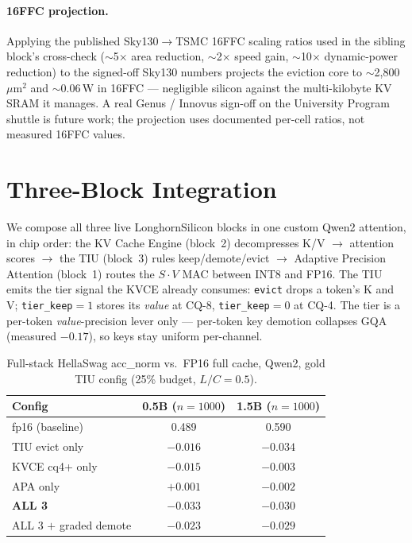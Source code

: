 \documentclass[10pt,twocolumn]{article}
\begin{document}
\paragraph{16FFC projection.}
Applying the published Sky130$\to$TSMC 16FFC scaling ratios used in the sibling
block's cross-check ($\sim$5$\times$ area reduction, $\sim$2$\times$ speed gain,
$\sim$10$\times$ dynamic-power reduction) to the signed-off Sky130 numbers projects
the eviction core to $\sim$2{,}800~$\mu$m$^2$ and $\sim$0.06\,\textmu W in 16FFC ---
negligible silicon against the multi-kilobyte KV SRAM it manages. A real Genus /
Innovus sign-off on the University Program shuttle is future work; the projection
uses documented per-cell ratios, not measured 16FFC values.

\section{Three-Block Integration}
\label{sec:integration}

We compose all three live LonghornSilicon blocks in one custom Qwen2 attention, in
chip order: the KV Cache Engine (block~2) decompresses K/V $\to$ attention scores
$\to$ the TIU (block~3) rules keep/demote/evict $\to$ Adaptive Precision Attention
(block~1) routes the $S\!\cdot\!V$ MAC between INT8 and FP16. The TIU emits the
tier signal the KVCE already consumes: \texttt{evict} drops a token's K and V;
\texttt{tier\_keep}$=1$ stores its \emph{value} at CQ-8, \texttt{tier\_keep}$=0$ at
CQ-4. The tier is a per-token \emph{value}-precision lever only --- per-token key
demotion collapses GQA (measured $-0.17$), so keys stay uniform per-channel.

\begin{table}[tbp]
\centering
\caption{Full-stack HellaSwag acc\_norm vs.\ FP16 full cache, Qwen2, gold TIU
  config (25\% budget, $L/C{=}0.5$).}
\label{tab:integration}
\small
\begin{tabular}{lcc}
\toprule
Config & 0.5B ($n{=}1000$) & 1.5B ($n{=}1000$) \\
\midrule
fp16 (baseline)          & 0.489 & 0.590 \\
TIU evict only           & $-0.016$ & $-0.034$ \\
KVCE cq4+ only           & $-0.015$ & $-0.003$ \\
APA only                 & $+0.001$ & $-0.002$ \\
\textbf{ALL 3}           & $\mathbf{-0.033}$ & $\mathbf{-0.030}$ \\
ALL 3 $+$ graded demote  & $-0.023$ & $-0.029$ \\
\bottomrule
\end{tabular}
\end{table}
\end{document}
